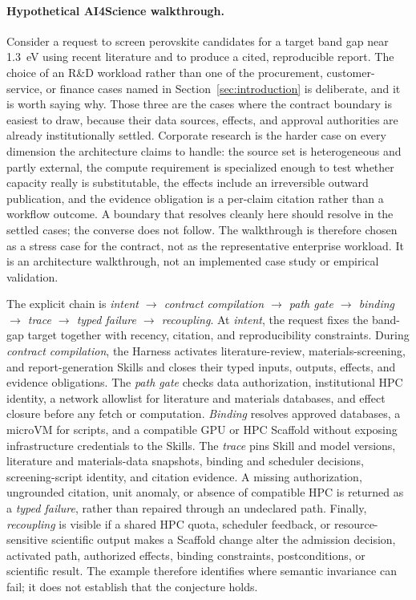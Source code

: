 \paragraph{Hypothetical AI4Science walkthrough.}
Consider a request to screen perovskite candidates for a target band gap near 1.3~eV using recent literature and to produce a cited, reproducible report. The choice of an R\&D workload rather than one of the procurement, customer-service, or finance cases named in Section~\ref{sec:introduction} is deliberate, and it is worth saying why. Those three are the cases where the contract boundary is easiest to draw, because their data sources, effects, and approval authorities are already institutionally settled. Corporate research is the harder case on every dimension the architecture claims to handle: the source set is heterogeneous and partly external, the compute requirement is specialized enough to test whether capacity really is substitutable, the effects include an irreversible outward publication, and the evidence obligation is a per-claim citation rather than a workflow outcome. A boundary that resolves cleanly here should resolve in the settled cases; the converse does not follow. The walkthrough is therefore chosen as a stress case for the contract, not as the representative enterprise workload. It is an architecture walkthrough, not an implemented case study or empirical validation.

The explicit chain is \textit{intent $\rightarrow$ contract compilation $\rightarrow$ path gate $\rightarrow$ binding $\rightarrow$ trace $\rightarrow$ typed failure $\rightarrow$ recoupling}. At \textit{intent}, the request fixes the band-gap target together with recency, citation, and reproducibility constraints. During \textit{contract compilation}, the Harness activates literature-review, materials-screening, and report-generation Skills and closes their typed inputs, outputs, effects, and evidence obligations. The \textit{path gate} checks data authorization, institutional HPC identity, a network allowlist for literature and materials databases, and effect closure before any fetch or computation. \textit{Binding} resolves approved databases, a microVM for scripts, and a compatible GPU or HPC Scaffold without exposing infrastructure credentials to the Skills. The \textit{trace} pins Skill and model versions, literature and materials-data snapshots, binding and scheduler decisions, screening-script identity, and citation evidence. A missing authorization, ungrounded citation, unit anomaly, or absence of compatible HPC is returned as a \textit{typed failure}, rather than repaired through an undeclared path. Finally, \textit{recoupling} is visible if a shared HPC quota, scheduler feedback, or resource-sensitive scientific output makes a Scaffold change alter the admission decision, activated path, authorized effects, binding constraints, postconditions, or scientific result. The example therefore identifies where semantic invariance can fail; it does not establish that the conjecture holds.

